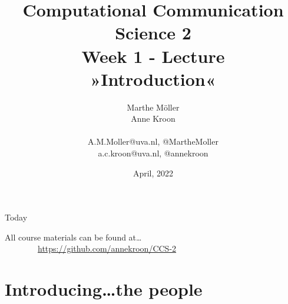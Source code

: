 \documentclass[handout]{beamer}
\title[Computational Communication Science 2]{\textbf{Computational Communication Science 2} \\Week 1 - Lecture\\ »Introduction«}
\author[Marthe Möller, Anne Kroon]{Marthe Möller \\ Anne Kroon \\ ~ \\ \footnotesize{A.M.Moller@uva.nl, @MartheMoller \\a.c.kroon@uva.nl, @annekroon} \\}
\date{April, 2022}
\institute[Digital Society Minor, University of Amsterdam]{Digital Society Minor, University of Amsterdam}
\begin{document}
	
	\begin{frame}{}
		\titlepage
	\end{frame}
	
	\begin{frame}{Today}
		\tableofcontents
	\end{frame}

\begin{frame} 
	All course materials can be found at\ldots \\
	~~~~~~~~\url{https://github.com/annekroon/CCS-2}
\end{frame}

\section{Introducing\ldots the people}
\end{document}
